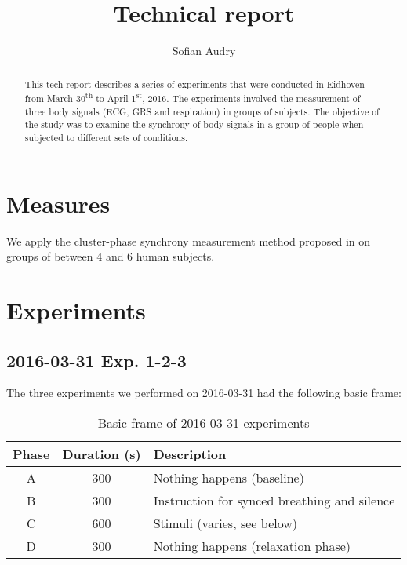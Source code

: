 \documentclass[a4paper,10pt]{article}
\title{Technical report}
\author{Sofian Audry}
\begin{document}
\maketitle

\begin{abstract}
This tech report describes a series of experiments that were conducted in Eidhoven from March 30\textsuperscript{th} to April 1\textsuperscript{st}, 2016. The experiments involved the measurement of three body signals (ECG, GRS and respiration) in groups of subjects. The objective of the study was to examine the synchrony of body signals in a group of people when subjected to different sets of conditions.
\end{abstract}

\section{Measures}

We apply the cluster-phase synchrony measurement method proposed in \citep{Richardson2012-Measuring} on groups of between 4 and 6 human subjects.

\section{Experiments}

\subsection{2016-03-31 Exp. 1-2-3}

The three experiments we performed on 2016-03-31 had the following basic frame:

\begin{table}[h]
\caption{Basic frame of 2016-03-31 experiments}
\begin{tabularx}{\textwidth}{|c|c|X|} \hline
Phase & Duration (s) & Description\\\hline\hline 
A        & 300              & Nothing happens (baseline)\\\hline
B        & 300              & Instruction for synced breathing and silence\\\hline
C        & 600              & Stimuli (varies, see below)\\\hline
D        & 300              & Nothing happens (relaxation phase)\\\hline
\end{tabularx}
\end{table}
\end{document}
